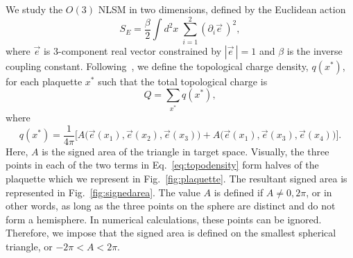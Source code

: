 \documentclass[a4paper,11pt]{article}
\newcommand{\e}{\vec e}
\begin{document}
We study the $O(3)$ NLSM in two dimensions, defined by the Euclidean action
\begin{equation*}
    \label{eq:nlsm euclidean action}
    S_E = \frac{\beta}{2} \int d^2x \; \sum_{i=1}^{2}\left(\partial_i \e\, \right)^2,
\end{equation*}
where $\e$ is 3-component real vector constrained by $|\e\,|=1$ and $\beta$ is the inverse coupling constant. Following~\cite{berg1981}, we define the topological charge density, $q(x^*)$, for each plaquette $x^*$ such that the total topological charge is
\begin{equation}
    Q = \sum_{x^*} q(x^*),
\end{equation}
where
\begin{equation}
  \label{eq:topodensity}
    q(x^*) = \frac{1}{4\pi} \bigg[A\Big(\e(x_1), \e(x_2), \e(x_3)\Big) + A\Big(\e(x_1), \e(x_3), \e(x_4)\Big) \bigg].
\end{equation}
Here, $A$ is the signed area of the triangle in target space. Visually, the three points in each of the two terms in Eq.~\ref{eq:topodensity} form halves of the plaquette which we represent in Fig.~\ref{fig:plaquette}. The resultant signed area is represented in Fig.~\ref{fig:signedarea}. The value $A$ is defined if $A\neq 0, 2\pi$, or in other words, as long as the three points on the sphere are distinct and do not form a hemisphere. In numerical calculations, these points can be ignored. Therefore, we impose that the signed area is defined on the smallest spherical triangle, or $-2\pi < A < 2\pi$.
\end{document}
